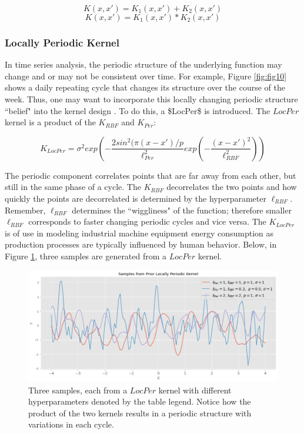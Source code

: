 \begin{equation}
    K(x, x') = K_1(x, x') + K_2(x, x')
\end{equation}
\begin{equation}
    K(x, x') = K_1(x, x') * K_2(x, x')
\end{equation}

\subsubsection{Locally Periodic Kernel}

In time series analysis, the periodic structure of the underlying function may change and or may not be consistent over time. For example, Figure \ref{fig:fig10} shows a daily repeating cycle that changes its structure over the course of the week. Thus, one may want to incorporate this locally changing periodic structure ``belief" into the kernel design \cite{gp_prices}. To do this, a \ac{$LocPer$} is introduced. The $LocPer$ kernel is a product of the $K_{RBF}$ and $K_{Per}$:

\begin{equation}
    K_{LocPer} = \sigma^2 exp (-\frac{2sin^2(\pi(x - x') / p}{\ell_{Per}^2}exp(-\frac{(x - x')^2}{\ell_{RBF}^2}))
\end{equation}

The periodic component correlates points that are far away from each other, but still in the same phase of a cycle. The $K_{RBF}$ decorrelates the two points and how quickly the points are decorrelated is determined by the hyperparameter $\ell_{RBF}$. Remember, $\ell_{RBF}$ determines the ``wiggliness" of the function; therefore smaller $\ell_{RBF}$ corresponds to faster changing periodic cycles and vice versa. The $K_{LocPer}$ is of use in modeling industrial machine equipment energy consumption as production processes are typically influenced by human behavior. Below, in Figure \ref{fig:fig5}, three samples are generated from a $LocPer$ kernel.

\begin{figure}[htp]
\centering
\graphicspath{ {./images/} }
\includegraphics[scale=0.49]{images/samples_locper_prior.png}
\caption{Three samples, each from a $LocPer$ kernel with different hyperparameters denoted by the table legend. Notice how the product of the two kernels results in a periodic structure with variations in each cycle.}
\label{fig:fig5}
\end{figure}

